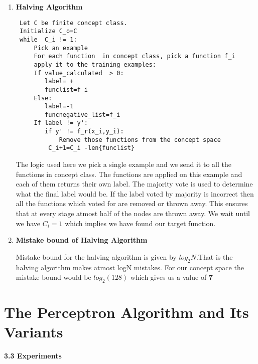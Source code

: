 \documentclass[12pt, fullpage,letterpaper]{article}
\begin{document}
\begin{enumerate}
\begin{enumerate}
	 \item \textbf{Halving Algorithm}		
\begin{verbatim}
 Let C be finite concept class.
 Initialize C_o=C
 while  C_i != 1:
	 Pick an example
	 For each function  in concept class, pick a function f_i 
	 apply it to the training examples:
	 If value_calculated  > 0:
	 	label= +
	 	funclist=f_i
	 Else:
	 	label=-1
	 	funcnegative_list=f_i
	 If label != y':
	 	if y' != f_r(x_i,y_i):
	 		Remove those functions from the concept space
	 	 C_i+1=C_i -len{funclist}					 
	 \end{verbatim}
	 	 
	 The logic used here we pick a single example and we send it to all the functions in concept class. The functions are applied on this example and each of them returns their own label. The majority vote is used to determine what the final label would be. If the label voted by majority is incorrect then all the functions which voted for are removed or thrown away. This ensures that at every stage atmost half of the nodes are thrown away. We wait until we have $C_i=1$ which implies we have found our target function.	 
	 	 
	 \item \textbf{ Mistake bound of Halving Algorithm}
	  
	  Mistake bound for the halving algorithm is given by $log_2 N$.That is the halving algorithm makes atmost logN mistakes.
	  For our concept space the mistake bound would be $log_2 (128)$ which gives us a value of \textbf{7}
	\end{enumerate}	
	
\end{enumerate}

\section{ The Perceptron Algorithm and Its Variants}


	 \textbf{3.3  Experiments}
	
\end{document}
